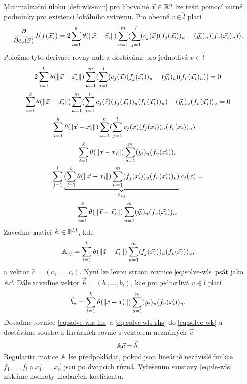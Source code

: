Minimalizační úlohu \ref{defi:wls-min} pro libovolné $\vec{x} \in \mathbb{R}^n$ lze řešit pomocí nutné podmínky pro existenci lokálního extrému. Pro obecné $v \in \hat l$ platí
\begin{equation}
  \frac{\partial}{\partial c_v(\vec{x})}J(f(\vec{x})) = 2\sum_{i=1}^k\theta(\|\vec{x} - \vec{x_i}\|)\sum_{u=1}^m(\sum_{j=1}^l (c_j(\vec{x})(f_j(\vec{x_i}))_u - (\vec{y_i})_u)(f_v(\vec{x_i})_u)). 
\end{equation}
Položme tyto derivace rovny nule a dostáváme pro jednotlivá $v \in \hat l$
\begin{multline}
  \label{eq:solve-wls}
  2\sum_{i=1}^k \theta(\|\vec{x} - \vec{x_i}\|) \sum_{u=1}^m (\sum_{j=1}^l (c_j(\vec{x})(f_j(\vec{x_i}))_u - (\vec{y_i})_u)(f_v(\vec{x_i})_u)) = 0\\
  \sum_{i=1}^k \theta(\|\vec{x} - \vec{x_i}\|) \sum_{u=1}^m (\sum_{j=1}^l c_j(\vec{x})(f_j(\vec{x_i}))_u(f_v(\vec{x_i}))_u) - (\vec{y_i})_u(f_v(\vec{x_i}))_u = 0\\
  \sum_{i=1}^k \theta(\|\vec{x} - \vec{x_i}\|) \sum_{u=1}^m (\sum_{j=1}^l c_j(\vec{x})(f_j(\vec{x_i}))_u(f_v(\vec{x_i}))_u) =\\ \sum_{i=1}^k \theta(\|\vec{x} - \vec{x_i}\|) \sum_{u=1}^m (\vec{y_i})_u(f_v(\vec{x_i}))_u\\
  \sum_{j=1}^l \underbrace{(\sum_{i=1}^k \theta(\|\vec{x} - \vec{x_i}\|) \sum_{u=1}^m (f_j(\vec{x_i}))_u(f_v(\vec{x_i}))_u)}_{\mathbb{A}_{vj}}c_j(\vec{x}) =\\ \sum_{i=1}^k \theta(\|\vec{x} - \vec{x_i}\|) \sum_{u=1}^m (\vec{y_i})_u(f_v(\vec{x_i}))_u.\\
\end{multline}
Zaveďme matici $\mathbb{A} \in \mathbb{R}^{l,l}$, kde
\begin{equation}
  \label{eq:solve-wls-lhs}
  \mathbb{A}_{vj} = \sum_{i=1}^k \theta(\|\vec{x} - \vec{x_i}\|) \sum_{u=1}^m (f_j(\vec{x_i}))_u(f_v(\vec{x_i}))_u,
\end{equation}
a vektor $\vec{c} = (c_1,\dots,c_l)$. Nyní lze levou stranu rovnice \ref{eq:solve-wls} psát jako $\mathbb{A}\vec{c}$. Dále zaveďme vektor $\vec{b} = (b_1,\ldots,b_l)$, kde pro jednotlivá $v \in \hat l$ platí
\begin{equation}
  \label{eq:solve-wls-rhs}
  \vec{b}_v = \sum_{i=1}^k \theta(\|\vec{x} - \vec{x_i}\|) \sum_{u=1}^m (\vec{y_i})_u(f_v(\vec{x_i}))_u.
\end{equation}
Dosaďme rovnice \ref{eq:solve-wls-lhs} a \ref{eq:solve-wls-rhs} do \ref{eq:solve-wls} a dostáváme soustavu lineárních rovnic s vektorem neznámých $\vec{c}$
\begin{equation}
  \label{eq:sle-wls}
  \mathbb{A}\vec{c} = \vec{b}.
\end{equation}
Regularitu matice $\mathbb{A}$ lze předpokládat, pokud jsou lineárně nezávislé funkce $f_1, \ldots, f_l$ a $\vec{x_1}, \ldots, \vec{x_n}$ jsou po dvojicích různá. Vyřešením soustavy \ref{eq:sle-wls} získáme hodnoty hledaných koeficientů.

